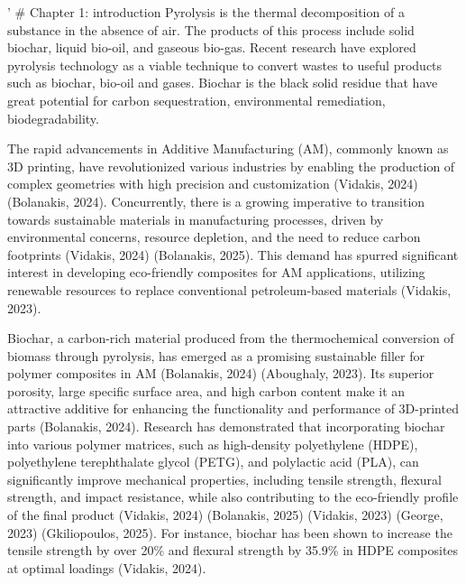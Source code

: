\documentclass[
]{article}
\begin{document}
' \# Chapter 1: introduction Pyrolysis is the thermal decomposition of a
substance in the absence of air. The products of this process include
solid biochar, liquid bio-oil, and gaseous bio-gas. Recent research have
explored pyrolysis technology as a viable technique to convert wastes to
useful products such as biochar, bio-oil and gases. Biochar is the black
solid residue that have great potential for carbon sequestration,
environmental remediation, biodegradability.

The rapid advancements in Additive Manufacturing (AM), commonly known as
3D printing, have revolutionized various industries by enabling the
production of complex geometries with high precision and customization
(Vidakis, 2024) (Bolanakis, 2024). Concurrently, there is a growing
imperative to transition towards sustainable materials in manufacturing
processes, driven by environmental concerns, resource depletion, and the
need to reduce carbon footprints (Vidakis, 2024) (Bolanakis, 2025). This
demand has spurred significant interest in developing eco-friendly
composites for AM applications, utilizing renewable resources to replace
conventional petroleum-based materials (Vidakis, 2023).

Biochar, a carbon-rich material produced from the thermochemical
conversion of biomass through pyrolysis, has emerged as a promising
sustainable filler for polymer composites in AM (Bolanakis, 2024)
(Aboughaly, 2023). Its superior porosity, large specific surface area,
and high carbon content make it an attractive additive for enhancing the
functionality and performance of 3D-printed parts (Bolanakis, 2024).
Research has demonstrated that incorporating biochar into various
polymer matrices, such as high-density polyethylene (HDPE), polyethylene
terephthalate glycol (PETG), and polylactic acid (PLA), can
significantly improve mechanical properties, including tensile strength,
flexural strength, and impact resistance, while also contributing to the
eco-friendly profile of the final product (Vidakis, 2024) (Bolanakis,
2025) (Vidakis, 2023) (George, 2023) (Gkiliopoulos, 2025). For instance,
biochar has been shown to increase the tensile strength by over 20\% and
flexural strength by 35.9\% in HDPE composites at optimal loadings
(Vidakis, 2024).
\end{document}
